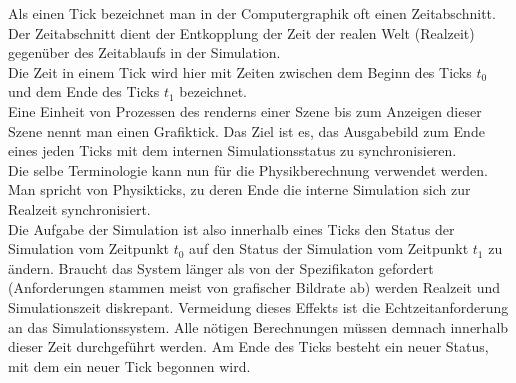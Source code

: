 
Als einen Tick bezeichnet man in der Computergraphik oft einen Zeitabschnitt. Der Zeitabschnitt dient der Entkopplung der Zeit der realen Welt (Realzeit) gegenüber des Zeitablaufs in der Simulation.\\
Die Zeit in einem Tick wird hier mit Zeiten zwischen dem Beginn des Ticks $t_0$ und dem Ende des Ticks $t_1$ bezeichnet.\\
Eine Einheit von Prozessen des renderns einer Szene bis zum Anzeigen dieser Szene nennt man einen Grafiktick. Das Ziel ist es, das Ausgabebild zum Ende eines jeden Ticks mit dem internen Simulationsstatus zu synchronisieren.\\
Die selbe Terminologie kann nun für die Physikberechnung verwendet werden. Man spricht von Physikticks, zu deren Ende die interne Simulation sich zur Realzeit synchronisiert.\\
Die Aufgabe der Simulation ist also innerhalb eines Ticks den Status der Simulation vom Zeitpunkt $t_0$ auf den Status der Simulation vom Zeitpunkt $t_1$ zu ändern. Braucht das System länger als von der Spezifikaton gefordert (Anforderungen stammen meist von grafischer Bildrate ab) werden Realzeit und Simulationszeit diskrepant. Vermeidung dieses Effekts ist die Echtzeitanforderung an das Simulationssystem.
Alle nötigen Berechnungen müssen demnach innerhalb dieser Zeit durchgeführt werden. Am Ende des Ticks besteht ein neuer Status, mit dem ein neuer Tick begonnen wird.\\

